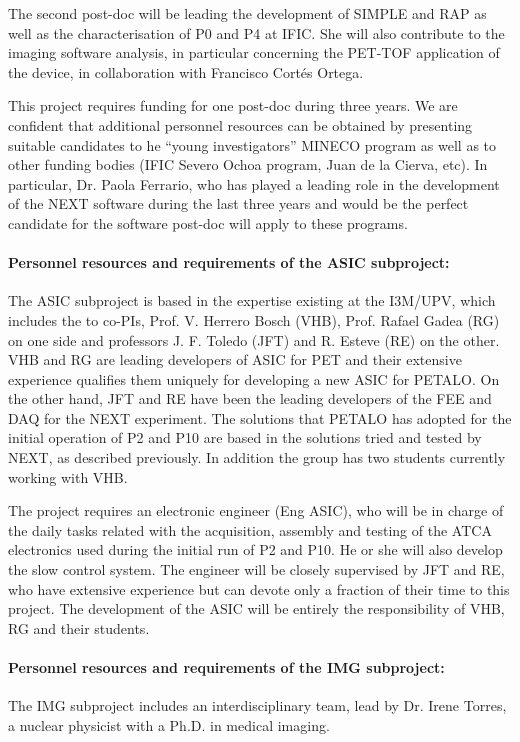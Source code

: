  The second post-doc will be leading the development of SIMPLE and RAP as well as the characterisation of P0 and P4 at IFIC. She will also contribute to the imaging software analysis, in particular concerning the PET-TOF application of the device, in collaboration with Francisco Cortés Ortega.
 
This project requires funding for one post-doc during three years. We are confident that additional personnel resources can be obtained by presenting suitable candidates to he ``young investigators'' MINECO program as well as to other funding bodies (IFIC Severo Ochoa program, Juan de la Cierva, etc). In particular,  
Dr. Paola Ferrario, who has played a leading role in the development of the NEXT software during the last three years and would be the perfect candidate for the software post-doc will apply to these programs. 
 
 \paragraph{Personnel resources and requirements of the ASIC subproject:} 

The ASIC subproject is based in the expertise existing  at the I3M/UPV, which includes the to co-PIs, Prof. V. Herrero Bosch (VHB), Prof. Rafael Gadea (RG) on one side and professors J. F. Toledo (JFT) and R. Esteve (RE) on the other. VHB and RG are leading developers of ASIC for PET and their extensive experience qualifies them uniquely for developing a new ASIC for PETALO. On the other hand, JFT and RE have been the leading developers of the FEE and DAQ for the NEXT experiment. The solutions that PETALO has adopted for the initial operation of P2 and P10 are based in the solutions tried and tested by NEXT, as described previously. 
In addition the group has two students currently working with VHB.

The project requires an electronic engineer (Eng ASIC), who will be in charge of the daily tasks related with the acquisition, assembly and testing of the ATCA electronics used during the initial run of P2 and P10.  He or she will also develop the slow control system. The engineer will be closely supervised by JFT and RE, who have extensive experience but can devote only a fraction of their time to this project. The development of the ASIC will be entirely the responsibility of VHB, RG and their students. 

 \paragraph{Personnel resources and requirements of the IMG subproject:}
 The IMG subproject includes an interdisciplinary team, lead by Dr. Irene Torres, a nuclear physicist with a Ph.D. in medical imaging. 
 
